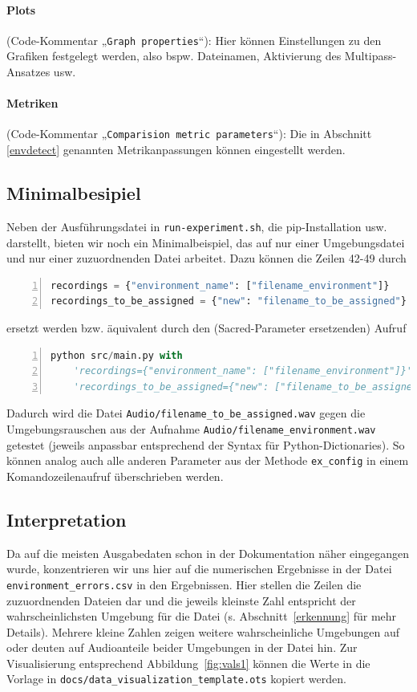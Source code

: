 \documentclass[
	fontsize=10.5pt,
	marginpar=false,
	ngerman,
	accentcolor=3d
	]{tudapub}
\begin{document}
\paragraph{Plots} (Code-Kommentar „\texttt{Graph properties}“): Hier können Einstellungen zu den Grafiken festgelegt werden, also bspw. Dateinamen, Aktivierung des Multipass-Ansatzes usw.

\paragraph{Metriken} (Code-Kommentar „\texttt{Comparision metric parameters}“): Die in Abschnitt \ref{envdetect} genannten Metrikanpassungen können eingestellt werden.

\subsection{Minimalbesipiel}
Neben der Ausführungsdatei in \texttt{run-experiment.sh}, die pip-Installation usw. darstellt, bieten wir noch ein Minimalbeispiel, das auf nur einer Umgebungsdatei und nur einer zuzuordnenden Datei arbeitet. Dazu können die Zeilen 42-49 durch
\begin{lstlisting}[numbers=left,language=Python]
recordings = {"environment_name": ["filename_environment"]}
recordings_to_be_assigned = {"new": "filename_to_be_assigned"}
\end{lstlisting}
ersetzt werden bzw. äquivalent durch den (Sacred-Parameter ersetzenden) Aufruf
\begin{lstlisting}[numbers=left,stepnumber=5,firstnumber=1,numberfirstline=true,showstringspaces=false,language=Python]
python src/main.py with
	'recordings={"environment_name": ["filename_environment"]}'
	'recordings_to_be_assigned={"new": ["filename_to_be_assigned"]}'
\end{lstlisting}
Dadurch wird die Datei \texttt{Audio/filename\_to\_be\_assigned.wav} gegen die Umgebungsrauschen aus der Aufnahme \texttt{Audio/filename\_environment.wav} getestet (jeweils anpassbar entsprechend der Syntax für Python-Dictionaries). So können analog auch alle anderen Parameter aus der Methode \texttt{ex\_config} in einem Komandozeilenaufruf überschrieben werden.

\subsection{Interpretation} 

Da auf die meisten Ausgabedaten schon in der Dokumentation näher eingegangen wurde, konzentrieren wir uns hier auf die numerischen Ergebnisse in der Datei \texttt{environment\_errors.csv} in den Ergebnissen. Hier stellen die Zeilen die zuzuordnenden Dateien dar und die jeweils kleinste Zahl entspricht der wahrscheinlichsten Umgebung für die Datei (s. Abschnitt~\ref{erkennung} für mehr Details). Mehrere kleine Zahlen zeigen weitere wahrscheinliche Umgebungen auf oder deuten auf Audioanteile beider Umgebungen in der Datei hin. Zur Visualisierung entsprechend Abbildung~\ref{fig:vals1} können die Werte in die Vorlage in \texttt{docs/data\_visualization\_template.ots} kopiert werden.

\appendix




\pagebreak
\printbibliography


\end{document}
